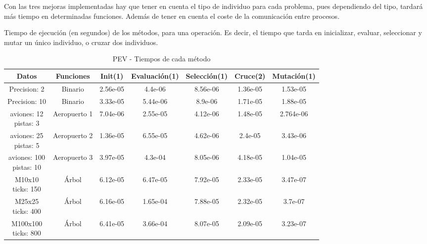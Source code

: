 Con las tres mejoras implementadas hay que tener en cuenta el tipo de individuo para cada problema, pues dependiendo del tipo, tardará más tiempo en determinadas funciones. Además de tener en cuenta el coste de la comunicación entre procesos.

Tiempo de ejecución (en segundos) de los métodos, para una operación. Es decir, el tiempo que tarda en inicializar, evaluar, seleccionar y mutar un único individuo, o cruzar dos individuos. 



\begin{center}
	\begin{table}[!h]
	\centering
	\begin{tabular}{|c|c|c|c|c|c|c|}
		\hline
		\rowcolor{lightgray}
		\textbf{Datos} & \textbf{Funciones} & \textbf{Init(1)} & \textbf{Evaluación(1)} & \textbf{Selección(1)} & \textbf{Cruce(2)} & \textbf{Mutación(1)} \\
		\hline
		Precision: 2 & Binario & 2.56e-05 & 4.4e-06 & 8.56e-06 & \cellcolor{redcell} 1.36e-05 & \cellcolor{redcell} 1.53e-05 \\
		\hline
		Precision: 10 & Binario & 3.33e-05 & 5.44e-06 & 8.9e-06 & \cellcolor{redcell} 1.71e-05 & \cellcolor{redcell} 1.88e-05 \\
		\hline
		\makecell{aviones: 12 \\ pistas: 3} & Aeropuerto 1 & 7.04e-06 & \cellcolor{redcell} 2.55e-05 & 4.12e-06 & 1.48e-05 & 2.764e-06 \\
		\hline
		\makecell{aviones: 25 \\ pistas: 5} & Aeropuerto 2 & 1.36e-05 & \cellcolor{redcell} 6.55e-05 & 4.62e-06 & 2.4e-05 & 3.43e-06 \\
		\hline
		\makecell{aviones: 100 \\ pistas: 10} & Aeropuerto 3 & 3.97e-05 & \cellcolor{redcell} 4.3e-04 & 8.05e-06 & 4.18e-05 & 1.04e-05 \\
		\hline
		\makecell{M10x10 \\ ticks: 150} & Árbol & 6.12e-05 & \cellcolor{redcell} 6.47e-05 & 7.92e-05 & 2.33e-05 & 3.47e-07 \\
		\hline
		\makecell{M25x25 \\ ticks: 400} & Árbol & 6.16e-05 & \cellcolor{redcell} 1.65e-04 & 7.88e-05 & 2.32e-05 & 3.7e-07 \\
		\hline
		\makecell{M100x100 \\ ticks: 800} & Árbol & 6.41e-05 & \cellcolor{redcell} 3.66e-04 & 8.07e-05 & 2.09e-05 & 3.23e-07 \\
		\hline
	\end{tabular}
	\caption{PEV - Tiempos de cada método}
	\label{tab:sample}
	\end{table}
\end{center}

